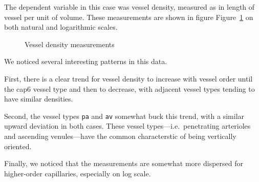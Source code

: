 \documentclass[
  letterpaper,
  DIV=11,
  numbers=noendperiod,
  oneside]{scrartcl}
\theoremstyle{plain}
\theoremstyle{remark}
\begin{document}
The dependent variable in this case was vessel density, measured as in
length of vessel per unit of volume. These measurements are shown in
figure Figure~\ref{fig-density-measurements} on both natural and
logarithmic scales.

\begin{figure}


\caption{\label{fig-density-measurements}Vessel density measurements}

\end{figure}%

We noticed several interesting patterns in this data.

First, there is a clear trend for vessel density to increase with vessel
order until the cap6 vessel type and then to decrease, with adjacent
vessel types tending to have similar densities.

Second, the vessel types \texttt{pa} and \texttt{av} somewhat buck this
trend, with a similar upward deviation in both cases. These vessel
types---i.e.~penetrating arterioles and ascending venules---have the
common characterstic of being vertically oriented.

Finally, we noticed that the measurements are somewhat more dispersed
for higher-order capillaries, especially on log scale.
\end{document}
